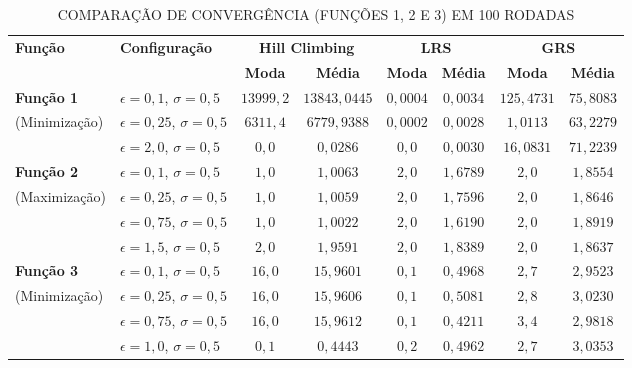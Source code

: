 \documentclass[journal,onecolumn]{IEEEtran}
\begin{document}
\begin{table}[H]
\renewcommand{\arraystretch}{1.2}
\caption{COMPARAÇÃO DE CONVERGÊNCIA (FUNÇÕES 1, 2 E 3) EM 100 RODADAS}
\label{tab:conv_f123}
\centering
\begin{tabular}{llcccccc}
\toprule
\textbf{Função} & \textbf{Configuração} & \multicolumn{2}{c}{\textbf{Hill Climbing}} & \multicolumn{2}{c}{\textbf{LRS}} & \multicolumn{2}{c}{\textbf{GRS}} \\
\cmidrule(lr){3-4} \cmidrule(lr){5-6} \cmidrule(lr){7-8}
& & \textbf{Moda} & \textbf{Média} & \textbf{Moda} & \textbf{Média} & \textbf{Moda} & \textbf{Média} \\
\midrule
\textbf{Função 1} & $\epsilon=0{,}1$, $\sigma=0{,}5$ & $13999{,}2$ & $13843{,}0445$ & $0{,}0004$ & $0{,}0034$ & $125{,}4731$ & $75{,}8083$ \\
(Minimização) & $\epsilon=0{,}25$, $\sigma=0{,}5$ & $6311{,}4$ & $6779{,}9388$ & $0{,}0002$ & $0{,}0028$ & $1{,}0113$ & $63{,}2279$ \\
& $\epsilon=2{,}0$, $\sigma=0{,}5$ & $0{,}0$ & $0{,}0286$ & $0{,}0$ & $0{,}0030$ & $16{,}0831$ & $71{,}2239$ \\
\midrule
\textbf{Função 2} & $\epsilon=0{,}1$, $\sigma=0{,}5$ & $1{,}0$ & $1{,}0063$ & $2{,}0$ & $1{,}6789$ & $2{,}0$ & $1{,}8554$ \\
(Maximização) & $\epsilon=0{,}25$, $\sigma=0{,}5$ & $1{,}0$ & $1{,}0059$ & $2{,}0$ & $1{,}7596$ & $2{,}0$ & $1{,}8646$ \\
& $\epsilon=0{,}75$, $\sigma=0{,}5$ & $1{,}0$ & $1{,}0022$ & $2{,}0$ & $1{,}6190$ & $2{,}0$ & $1{,}8919$ \\
& $\epsilon=1{,}5$, $\sigma=0{,}5$ & $2{,}0$ & $1{,}9591$ & $2{,}0$ & $1{,}8389$ & $2{,}0$ & $1{,}8637$ \\
\midrule
\textbf{Função 3} & $\epsilon=0{,}1$, $\sigma=0{,}5$ & $16{,}0$ & $15{,}9601$ & $0{,}1$ & $0{,}4968$ & $2{,}7$ & $2{,}9523$ \\
(Minimização) & $\epsilon=0{,}25$, $\sigma=0{,}5$ & $16{,}0$ & $15{,}9606$ & $0{,}1$ & $0{,}5081$ & $2{,}8$ & $3{,}0230$ \\
& $\epsilon=0{,}75$, $\sigma=0{,}5$ & $16{,}0$ & $15{,}9612$ & $0{,}1$ & $0{,}4211$ & $3{,}4$ & $2{,}9818$ \\
& $\epsilon=1{,}0$, $\sigma=0{,}5$ & $0{,}1$ & $0{,}4443$ & $0{,}2$ & $0{,}4962$ & $2{,}7$ & $3{,}0353$ \\
\bottomrule
\end{tabular}
\end{table}
\end{document}
